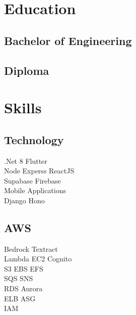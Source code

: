 \documentclass[]{deedy-resume-reversed}
\begin{document}
\hfill
\begin{minipage}[t]{0.33\textwidth}


\section{Education}

\subsection{Bachelor of Engineering}
\sectionsep

\subsection{Diploma}
\sectionsep


\section{Skills}

\subsection{Technology}
.Net 8 \textbullet Flutter \\
Node  \textbullet Experss \textbullet ReactJS \textbullet \\ 
Supabase \textbullet Firebase  \\
Mobile Applications \\
Django \textbullet Hono \textbullet
\sectionsep

\subsection{AWS}
Bedrock \textbullet Textract \\
Lambda \textbullet EC2 \textbullet Cognito \\
S3 \textbullet EBS \textbullet EFS\\
SQS \textbullet SNS \\
RDS \textbullet Aurora \\
ELB \textbullet ASG \\
IAM \\
\sectionsep


\end{minipage}
\end{document}

